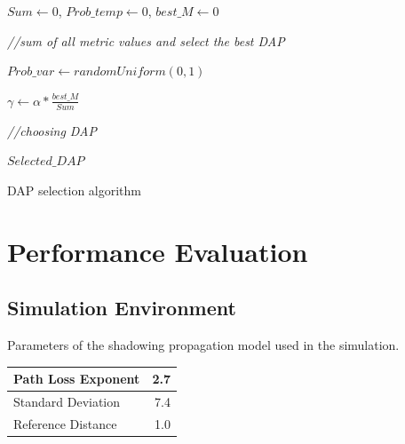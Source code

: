 \documentclass[conference]{IEEEtran}
\begin{document}
\IncMargin{1em}
\begin{algorithm}

$Sum \leftarrow 0$, $Prob\_temp \leftarrow 0$, $best\_M \leftarrow 0$

\emph{//sum of all metric values and select the best DAP }

\BlankLine
$ Prob\_var \leftarrow randomUniform(0,1)$

$\gamma \leftarrow \alpha * \frac {best\_M}{Sum} $

\emph{//choosing DAP }


\KwRet
{$ Selected\_DAP $}

\BlankLine
\caption{DAP selection algorithm}\label{prob}
\end{algorithm}\DecMargin{1em}


\section{Performance Evaluation}




\subsection{Simulation Environment}  

\begin{table}[htbp]
\caption{Parameters of the shadowing propagation model used in the simulation.}
\begin{center}\begin {tabular}{|l|r|}
\hline
	Path Loss Exponent & 2.7\\
\hline
	Standard Deviation & 7.4\\
\hline
	Reference Distance & 1.0\\
\hline
\end{tabular}
\end{center}
	\label{param}
\end{table}
\end{document}
